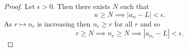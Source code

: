 \documentclass[11pt]{article}
\begin{document}
\begin{proof}
    Let $\epsilon > 0$. Then there exists $N$ such that
    \[
        n \geq N \implies |a_n - L| < \epsilon.
    \]
    As $r \mapsto n_r$ is increasing then $n_r \geq r$ for all $r$ and so
    \[
        r \geq N \implies n_r \geq N \implies |a_{n_r} - L| < \epsilon.
    \]
\end{proof}
\end{document}
